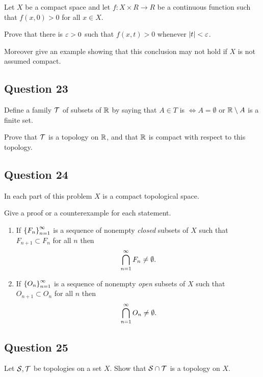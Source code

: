 \documentclass[12pt]{article}
\begin{document}
Let \(X\) be a compact space and let \(f : X \times R \to R\) be a
continuous function such that \(f (x, 0) > 0\) for all \(x \in X\).

Prove that there is \(\varepsilon > 0\) such that \(f (x, t) > 0\) whenever
\({\left\lvert {t} \right\rvert} < \varepsilon\).

Moreover give an example showing that this conclusion may not hold if
\(X\) is not assumed compact.

\hypertarget{question-23-3}{%
\subsection{Question 23}\label{question-23-3}}

Define a family \({\mathcal{T}}\) of subsets of \({\mathbb{R}}\) by saying that
\(A \in T\) is \(\iff A = \emptyset\) or \({\mathbb{R}} \setminus A\) is a finite
set.

Prove that \({\mathcal{T}}\) is a topology on \({\mathbb{R}}\), and that \({\mathbb{R}}\) is
compact with respect to this topology.

\hypertarget{question-24-3}{%
\subsection{Question 24}\label{question-24-3}}

In each part of this problem \(X\) is a compact topological space.

Give a proof or a counterexample for each statement.

\begin{enumerate}
\def\labelenumi{\alph{enumi}.}
\item
  If \(\left\{{F_n }\right\}_{n=1}^\infty\) is a sequence of nonempty
  \emph{closed} subsets of \(X\) such that \(F_{n+1} \subset F_{n}\) for
  all \(n\) then \[\bigcap^\infty_{n=1} F_n\neq \emptyset.\]
\item
  If \(\left\{{O_n}\right\}_{n=1}^\infty\) is a sequence of nonempty \emph{open}
  subsets of \(X\) such that \(O_{n+1} \subset O_n\) for all \(n\) then
  \[\bigcap_{n=1}^\infty O_{n}\neq \emptyset.\]
\end{enumerate}

\hypertarget{question-25-3}{%
\subsection{Question 25}\label{question-25-3}}

Let \({\mathcal{S}}, {\mathcal{T}}\) be topologies on a set \(X\). Show that
\({\mathcal{S}} \cap {\mathcal{T}}\) is a topology on \(X\).
\end{document}
